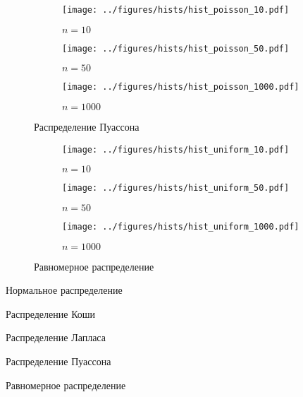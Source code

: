 \documentclass[12pt]{report}
\begin{document}
	\begin{figure}[H]
		\centering
		\begin{subfigure}[t]{.3\linewidth}
			\centering\texttt{[image: ../figures/hists/hist\_poisson\_10.pdf]}
			\caption*{$n = 10$}
		\end{subfigure}
		\begin{subfigure}[t]{.3\linewidth}
			\centering\texttt{[image: ../figures/hists/hist\_poisson\_50.pdf]}
			\caption*{$n = 50$}
		\end{subfigure}
		\begin{subfigure}[t]{.3\linewidth}
			\centering\texttt{[image: ../figures/hists/hist\_poisson\_1000.pdf]}
			\caption*{$n = 1000$}
		\end{subfigure}
		\caption{Распределение Пуассона}
	\end{figure}
	\begin{figure}[H]
		\centering
		\begin{subfigure}[t]{.3\linewidth}
			\centering\texttt{[image: ../figures/hists/hist\_uniform\_10.pdf]}
			\caption*{$n = 10$}
		\end{subfigure}
		\begin{subfigure}[t]{.3\linewidth}
			\centering\texttt{[image: ../figures/hists/hist\_uniform\_50.pdf]}
			\caption*{$n = 50$}
		\end{subfigure}
		\begin{subfigure}[t]{.3\linewidth}
			\centering\texttt{[image: ../figures/hists/hist\_uniform\_1000.pdf]}
			\caption*{$n = 1000$}
		\end{subfigure}
		\caption{Равномерное распределение}
	\end{figure}
	
	\begin{table}[H]
		\centering
		
		\caption{Нормальное распределение}
	\end{table}
	\begin{table}[H]
		\centering
		
		\caption{Распределение Коши}
	\end{table}
	\begin{table}[H]
		\centering
		
		\caption{Распределение Лапласа}
	\end{table}
	\begin{table}[H]
		\centering
		
		\caption{Распределение Пуассона}
	\end{table}
	\begin{table}[H]
		\centering
		
		\caption{Равномерное распределение}
	\end{table}
\end{document}
